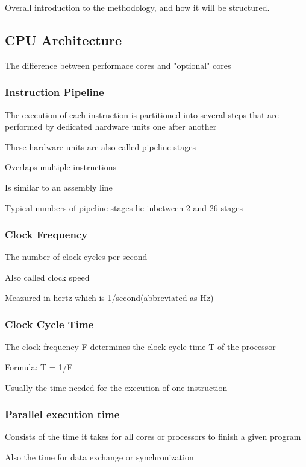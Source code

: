 \documentclass{article}
\begin{document}
Overall introduction to the methodology, and how it will be structured.

\subsection{CPU Architecture}

The difference between performace cores and "optional" cores

\subsubsection{Instruction Pipeline}
The execution of each instruction is partitioned into several steps that are performed by dedicated hardware units one after another


These hardware units are also called pipeline stages

Overlaps multiple instructions

Is similar to an assembly line

Typical numbers of pipeline stages lie inbetween 2 and 26 stages

\subsubsection{Clock Frequency}

The number of clock cycles per second

Also called clock speed

Meazured in hertz which is 1/second(abbreviated as Hz)

\subsubsection{Clock Cycle Time}

The clock frequency F determines the clock cycle time T of the processor

Formula: T = 1/F

Usually the time needed for the execution of one instruction

\subsubsection{Parallel execution time}

Consists of the time it takes for all cores or processors to finish a given program

Also the time for data exchange or synchronization
\end{document}

